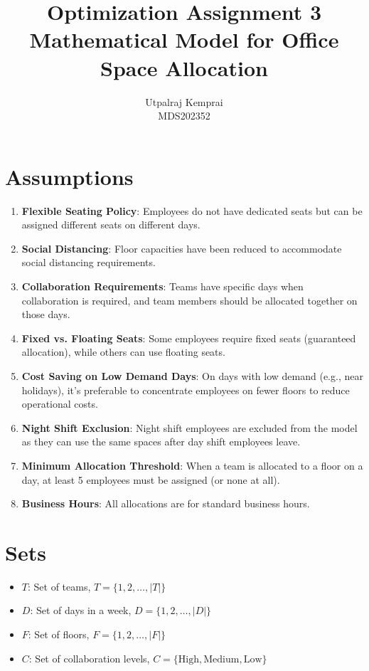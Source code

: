 \documentclass[12pt]{article}
\begin{document}
\title{Optimization Assignment 3 \\
Mathematical Model for Office Space Allocation}
\author{Utpalraj Kemprai\\MDS202352}
\date{}
\maketitle

\section{Assumptions}

\begin{enumerate}
\item \textbf{Flexible Seating Policy}: Employees do not have dedicated seats but can be assigned different seats on different days.

\item \textbf{Social Distancing}: Floor capacities have been reduced to accommodate social distancing requirements.

\item \textbf{Collaboration Requirements}: Teams have specific days when collaboration is required, and team members should be allocated together on those days.

\item \textbf{Fixed vs. Floating Seats}: Some employees require fixed seats (guaranteed allocation), while others can use floating seats.

\item \textbf{Cost Saving on Low Demand Days}: On days with low demand (e.g., near holidays), it's preferable to concentrate employees on fewer floors to reduce operational costs.

\item \textbf{Night Shift Exclusion}: Night shift employees are excluded from the model as they can use the same spaces after day shift employees leave.

\item \textbf{Minimum Allocation Threshold}: When a team is allocated to a floor on a day, at least 5 employees must be assigned (or none at all).

\item \textbf{Business Hours}: All allocations are for standard business hours.
\end{enumerate}

\section{Sets}
\begin{itemize}
\item $T$: Set of teams, $T = \{1, 2, \ldots, |T|\}$
\item $D$: Set of days in a week, $D = \{1, 2, \ldots, |D|\}$
\item $F$: Set of floors, $F = \{1, 2, \ldots, |F|\}$
\item $C$: Set of collaboration levels, $C = \{\text{High}, \text{Medium}, \text{Low}\}$
\end{itemize}
\end{document}
